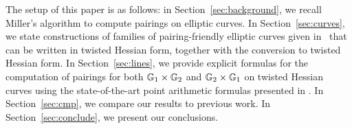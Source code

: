 The setup of this paper is as follows:
in Section~\ref{sec:background}, we recall Miller's algorithm to compute pairings on elliptic curves.
In Section~\ref{sec:curves}, we state constructions of families of pairing-friendly elliptic curves given in~\cite{2010/freeman}
that can be written in twisted Hessian form, together with the conversion
to twisted Hessian form.
In Section~\ref{sec:lines}, we provide explicit formulas for the computation of 
pairings for both $\mathbb{G}_{1} \times \mathbb{G}_{2}$ and $\mathbb{G}_{2} \times \mathbb{G}_{1}$ 
on twisted Hessian curves
using the state-of-the-art point arithmetic formulas presented in \cite{2015/hessian}.
In Section~\ref{sec:cmp}, we compare our results to previous work.
In Section~\ref{sec:conclude}, we present our conclusions.


